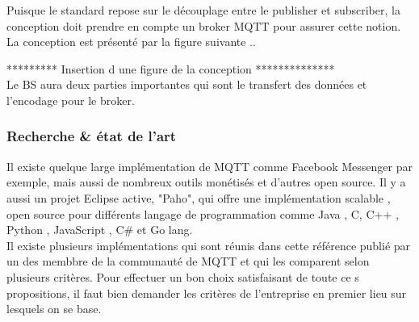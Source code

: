        Puisque le standard repose sur le découplage entre le publisher et subscriber, la conception doit prendre 
        en compte  un broker MQTT pour assurer cette notion. 
        La conception est présenté par la figure suivante .. 

 ********* Insertion d une figure de la conception ************** \\
        Le BS aura deux parties importantes qui sont le transfert des données et l'encodage pour le broker.

    \subsubsection{Recherche \& état de l'art}
            

        Il existe quelque large implémentation de MQTT comme Facebook Messenger par exemple, mais aussi de nombreux 
        outils monétisés et d'autres open source.
        Il y a aussi un projet Eclipse active, "Paho", qui offre une implémentation scalable , open source pour 
        différents langage de programmation comme Java , 
        C, C++ , Python , JavaScript , C\# et Go lang. \\
        Il existe plusieurs implémentations qui sont réunis dans cette référence \cite{mqtt_choix} publié par un des membbre de la communauté de MQTT et qui les comparent selon plusieurs critères. 
        Pour effectuer un bon choix satisfaisant de toute ce    s propositions, il faut bien demander les critères de l'entreprise en premier lieu 
        sur lesquels on se base. \\
        
